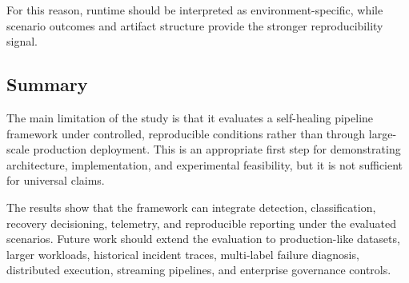 For this reason, runtime should be interpreted as environment-specific, while scenario outcomes and artifact structure provide the stronger reproducibility signal.

\subsection{Summary}

The main limitation of the study is that it evaluates a self-healing pipeline framework under controlled, reproducible conditions rather than through large-scale production deployment. This is an appropriate first step for demonstrating architecture, implementation, and experimental feasibility, but it is not sufficient for universal claims.

The results show that the framework can integrate detection, classification, recovery decisioning, telemetry, and reproducible reporting under the evaluated scenarios. Future work should extend the evaluation to production-like datasets, larger workloads, historical incident traces, multi-label failure diagnosis, distributed execution, streaming pipelines, and enterprise governance controls.

